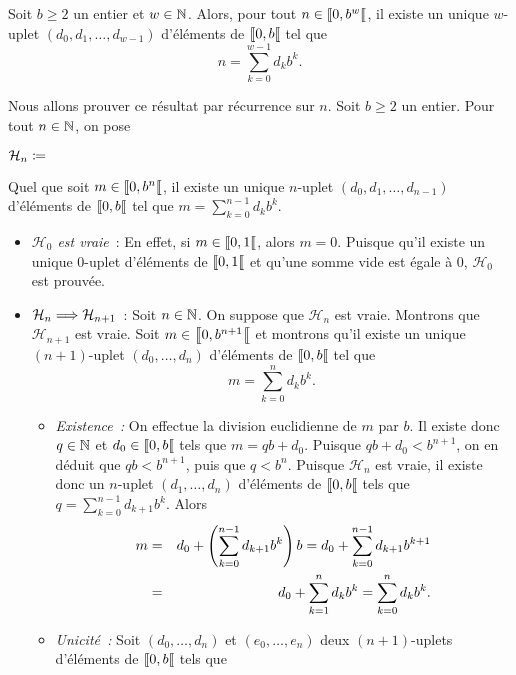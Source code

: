 \documentclass{magnolia}
\begin{document}
\begin{proposition}
Soit $b\geq 2$ un entier et $w\in\mathbb{N}$. Alors, pour tout $n\in\left\llbracket 0,b^w\right\llbracket$, il existe un unique $w$-uplet $(d_0,d_1,\ldots,d_{w-1})$ d'éléments de $\left\llbracket 0,b\right\llbracket$ tel que
\[n=\sum_{k=0}^{w-1} d_k b^k.\]
\end{proposition}

\begin{preuve}
Nous allons prouver ce résultat par récurrence sur $n$. Soit $b\geq 2$ un entier. Pour tout $n\in\mathbb{N}$, on pose
\begin{center}
$\mathcal{H}_n\coloneqq$ \og
\begin{minipage}[t]{0.6\linewidth}
Quel que soit $m\in\left\llbracket 0,b^n\right\llbracket$, il existe un unique $n$-uplet $(d_0,d_1,\ldots,d_{n-1})$ d'éléments de $\left\llbracket 0,b\right\llbracket$ tel que
$m=\sum_{k=0}^{n-1} d_k b^k$.\fg
\end{minipage}
\end{center}
\begin{itemize}
\item \emph{$\mathcal{H}_0$ est vraie}~: En effet, si $m\in\left\llbracket 0,1\right\llbracket$, alors $m=0$. Puisque qu'il existe un unique $0$-uplet d'éléments de $\left\llbracket 0,1\right\llbracket$ et qu'une somme vide est égale à 0, $\mathcal{H}_0$ est prouvée.
\item $\mathcal{H}_n\Longrightarrow\mathcal{H}_{n+1}$~: Soit $n\in\mathbb{N}$. On suppose que $\mathcal{H}_n$ est vraie. Montrons que $\mathcal{H}_{n+1}$ est vraie. Soit $m\in\left\llbracket 0,b^{n+1}\right\llbracket$ et montrons qu'il existe un unique $(n+1)$-uplet $(d_0,\ldots,d_n)$ d'éléments de $\left\llbracket 0,b\right\llbracket$ tel que
\[m=\sum_{k=0}^{n} d_k b^k.\]
\begin{itemize}
\item \emph{Existence~:} On effectue la division euclidienne de $m$ par $b$. Il existe donc $q\in\mathbb{N}$ et $d_0\in\left\llbracket 0,b\right\llbracket$ tels que $m=qb+d_0$. Puisque $qb+d_0< b^{n+1}$, on en déduit que $qb<b^{n+1}$, puis que $q<b^n$. Puisque $\mathcal{H}_n$ est vraie, il existe donc un $n$-uplet $(d_1,\ldots,d_n)$ d'éléments de $\left\llbracket 0,b\right\llbracket$ tels que $q=\sum_{k=0}^{n-1} d_{k+1} b^k$. Alors
\begin{eqnarray*}
m & = & d_0+\left(\sum_{k=0}^{n-1} d_{k+1} b^k\right)b = d_0+\sum_{k=0}^{n-1} d_{k+1} b^{k+1}\\
  & = & d_0+\sum_{k=1}^{n} d_{k} b^{k} = \sum_{k=0}^{n} d_{k} b^{k}.
\end{eqnarray*}
\item \emph{Unicité~:} Soit $(d_0,\ldots,d_n)$ et $(e_0,\ldots,e_n)$ deux $(n+1)$-uplets d'éléments de $\left\llbracket 0,b\right\llbracket$ tels que

\end{itemize}
\end{itemize}
\end{preuve}
\end{document}
